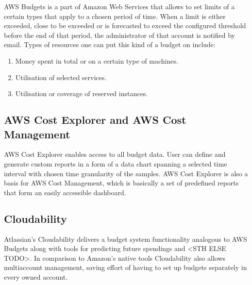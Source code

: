 \documentclass[licencjacka,en]{thesisclass}
\begin{document}
        AWS Budgets is a part of Amazon Web Services that allows to set limits of a certain types
        that apply to a chosen period of time. When a limit is either exceeded,
        close to be exceeded or is forecasted to exceed the configured threshold before the end of that period,
        the administrator of that account is notified by email. Types of resources one can put this kind of a budget on include:
        
        \begin{enumerate}
            \item Money spent in total or on a certain type of machines.
            \item Utilisation of selected services.
            \item Utilisation or coverage of reserved instances.
        \end{enumerate}
	\begin{flushright}
		\cite{AWSDocs}
	\end{flushright}

        \subsection{AWS Cost Explorer and AWS Cost Management}

	AWS Cost Explorer enables access to all budget data. User can define and generate custom reports in a form of a data chart spanning a selected time interval with chosen time granularity of the samples.
	AWS Cost Explorer is also a basis for AWS Cost Management, which is basically a set of predefined reports that form an easily accessible dashboard.

	\subsection{Cloudability}

	Atlassian's Cloudability delivers a budget system functionality analogous to AWS Budgets
	along with tools for predicting future spendings and <STH ELSE TODO>. In comparison to Amazon's
	native tools Cloudability also allows multiaccount management, saving effort of having to set up budgets separately in every owned account.
\end{document}
